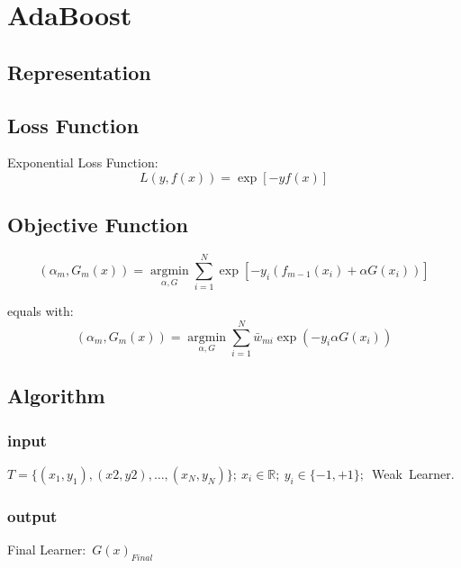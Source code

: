 \chapter{AdaBoost}


\section{Representation}

\section{Loss Function}
Exponential Loss Function:
\begin{equation}
L(y,f(x))=\exp[-yf(x)]
\end{equation}

\section{Objective Function}

\begin{equation}
(\alpha_m,G_m(x))= \underset{\alpha,G}{\operatorname{argmin}} \sum_{i=1}^N \exp{[-y_i(f_{m-1}(x_i)+\alpha G(x_i))]}
\end{equation}

equals with:
\begin{equation}
(\alpha_m,G_m(x))= \underset{\alpha,G}{\operatorname{argmin}} \sum_{i=1}^N {\bar{w}}_{mi} \exp{(-y_i \alpha G(x_i))}
\end{equation}

\section{Algorithm}
\subsection{input}
$T=\{(x_1,y_1),(x2,y2),\dotsc,(x_N,y_N) \};\ x_i\in \mathbb{R};\ y_i \in \{-1,+1\};$\ Weak\ Learner.
\subsection{output}
Final Learner:\ $G(x)_{Final}$

